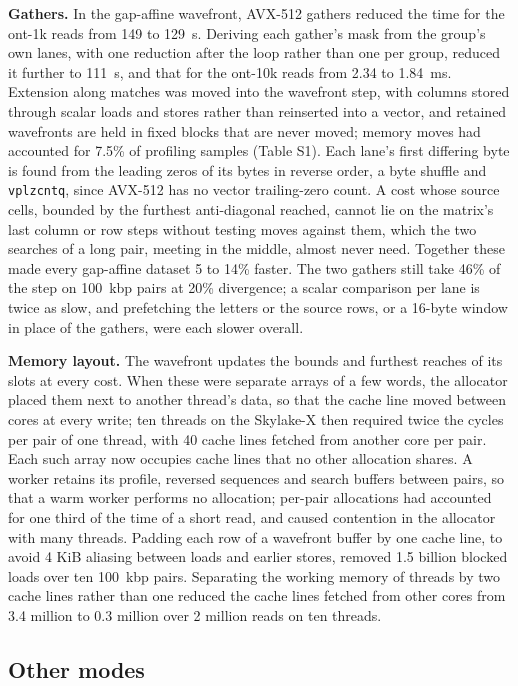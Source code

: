 \documentclass[10pt]{article}
\begin{document}
\textbf{Gathers.} In the gap-affine wavefront, AVX-512 gathers reduced the time for the ont-1k reads from 149 to 129~\textmu s. Deriving each gather's mask from the group's own lanes, with one reduction after the loop rather than one per group, reduced it further to 111~\textmu s, and that for the ont-10k reads from 2.34 to 1.84~ms. Extension along matches was moved into the wavefront step, with columns stored through scalar loads and stores rather than reinserted into a vector, and retained wavefronts are held in fixed blocks that are never moved; memory moves had accounted for 7.5\% of profiling samples (Table S1). Each lane's first differing byte is found from the leading zeros of its bytes in reverse order, a byte shuffle and \texttt{vplzcntq}, since AVX-512 has no vector trailing-zero count. A cost whose source cells, bounded by the furthest anti-diagonal reached, cannot lie on the matrix's last column or row steps without testing moves against them, which the two searches of a long pair, meeting in the middle, almost never need. Together these made every gap-affine dataset 5 to 14\% faster. The two gathers still take 46\% of the step on 100~kbp pairs at 20\% divergence; a scalar comparison per lane is twice as slow, and prefetching the letters or the source rows, or a 16-byte window in place of the gathers, were each slower overall.

\textbf{Memory layout.} The wavefront updates the bounds and furthest reaches of its slots at every cost. When these were separate arrays of a few words, the allocator placed them next to another thread's data, so that the cache line moved between cores at every write; ten threads on the Skylake-X then required twice the cycles per pair of one thread, with 40 cache lines fetched from another core per pair. Each such array now occupies cache lines that no other allocation shares. A worker retains its profile, reversed sequences and search buffers between pairs, so that a warm worker performs no allocation; per-pair allocations had accounted for one third of the time of a short read, and caused contention in the allocator with many threads. Padding each row of a wavefront buffer by one cache line, to avoid 4 KiB aliasing between loads and earlier stores, removed 1.5 billion blocked loads over ten 100~kbp pairs. Separating the working memory of threads by two cache lines rather than one reduced the cache lines fetched from other cores from 3.4 million to 0.3 million over 2 million reads on ten threads.

\subsection{Other modes}
\end{document}
